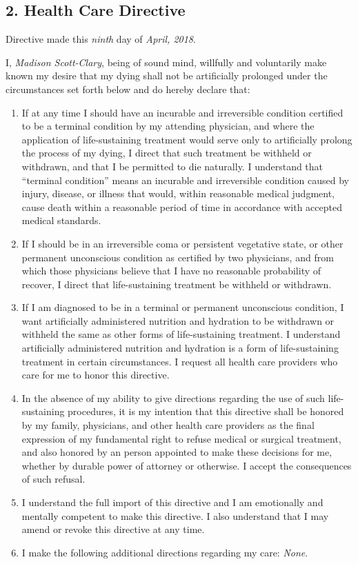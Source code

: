 \documentclass[oneside]{memoir}
\begin{document}
\subsection{2. Health Care Directive}\label{health-care-directive}

Directive made this \emph{ninth} day of \emph{April, 2018}.

\vspace{1ex}

\noindent I, \emph{Madison Scott-Clary}, being of sound mind, willfully and voluntarily make known my desire that my dying shall not be artificially prolonged under the circumstances set forth below and do hereby declare that:

\begin{enumerate}
\def\labelenumi{\arabic{enumi}.}
\tightlist
\item
  If at any time I should have an incurable and irreversible condition certified to be a terminal condition by my attending physician, and where the application of life-sustaining treatment would serve only to artificially prolong the process of my dying, I direct that such treatment be withheld or withdrawn, and that I be permitted to die naturally. I understand that ``terminal condition'' means an incurable and irreversible condition caused by injury, disease, or illness that would, within reasonable medical judgment, cause death within a reasonable period of time in accordance with accepted medical standards.
\item
  If I should be in an irreversible coma or persistent vegetative state, or other permanent unconscious condition as certified by two physicians, and from which those physicians believe that I have no reasonable probability of recover, I direct that life-sustaining treatment be withheld or withdrawn.
\item
  If I am diagnosed to be in a terminal or permanent unconscious condition, I want artificially administered nutrition and hydration to be withdrawn or withheld the same as other forms of life-sustaining treatment. I understand artificially administered nutrition and hydration is a form of life-sustaining treatment in certain circumstances. I request all health care providers who care for me to honor this directive.
\item
  In the absence of my ability to give directions regarding the use of such life-sustaining procedures, it is my intention that this directive shall be honored by my family, physicians, and other health care providers as the final expression of my fundamental right to refuse medical or surgical treatment, and also honored by an person appointed to make these decisions for me, whether by durable power of attorney or otherwise. I accept the consequences of such refusal.
\item
  I understand the full import of this directive and I am emotionally and mentally competent to make this directive. I also understand that I may amend or revoke this directive at any time.
\item
  I make the following additional directions regarding my care: \emph{None}.
\end{enumerate}
\end{document}
